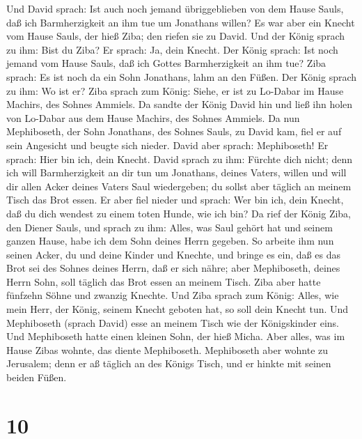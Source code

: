  Und David sprach: Ist auch noch jemand übriggeblieben von
dem Hause Sauls, daß ich Barmherzigkeit an ihm tue um Jonathans willen?
 Es war aber ein Knecht vom Hause Sauls, der hieß Ziba; den
riefen sie zu David. Und der König sprach zu ihm: Bist du Ziba? Er
sprach: Ja, dein Knecht.  Der König sprach: Ist noch jemand
vom Hause Sauls, daß ich Gottes Barmherzigkeit an ihm tue? Ziba sprach:
Es ist noch da ein Sohn Jonathans, lahm an den Füßen.  Der
König sprach zu ihm: Wo ist er? Ziba sprach zum König: Siehe, er ist zu
Lo-Dabar im Hause Machirs, des Sohnes Ammiels.  Da sandte
der König David hin und ließ ihn holen von Lo-Dabar aus dem Hause
Machirs, des Sohnes Ammiels.  Da nun Mephiboseth, der Sohn
Jonathans, des Sohnes Sauls, zu David kam, fiel er auf sein Angesicht
und beugte sich nieder. David aber sprach: Mephiboseth! Er sprach: Hier
bin ich, dein Knecht.  David sprach zu ihm: Fürchte dich
nicht; denn ich will Barmherzigkeit an dir tun um Jonathans, deines
Vaters, willen und will dir allen Acker deines Vaters Saul wiedergeben;
du sollst aber täglich an meinem Tisch das Brot essen.  Er
aber fiel nieder und sprach: Wer bin ich, dein Knecht, daß du dich
wendest zu einem toten Hunde, wie ich bin?  Da rief der
König Ziba, den Diener Sauls, und sprach zu ihm: Alles, was Saul gehört
hat und seinem ganzen Hause, habe ich dem Sohn deines Herrn gegeben.
 So arbeite ihm nun seinen Acker, du und deine Kinder und
Knechte, und bringe es ein, daß es das Brot sei des Sohnes deines Herrn,
daß er sich nähre; aber Mephiboseth, deines Herrn Sohn, soll täglich das
Brot essen an meinem Tisch. Ziba aber hatte fünfzehn Söhne und zwanzig
Knechte.  Und Ziba sprach zum König: Alles, wie mein Herr,
der König, seinem Knecht geboten hat, so soll dein Knecht tun. Und
Mephiboseth (sprach David) esse an meinem Tisch wie der Königskinder
eins.  Und Mephiboseth hatte einen kleinen Sohn, der hieß
Micha. Aber alles, was im Hause Zibas wohnte, das diente Mephiboseth.
 Mephiboseth aber wohnte zu Jerusalem; denn er aß täglich
an des Königs Tisch, und er hinkte mit seinen beiden Füßen.

\hypertarget{section-9}{%
\section{10}\label{section-9}}

